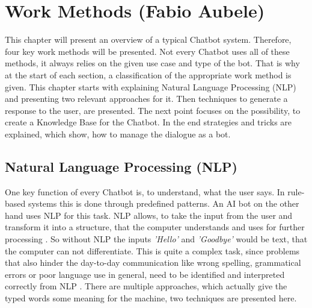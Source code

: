\documentclass[10pt,final,journal,a4paper,oneside,twocolumn]{IEEEtran}
\begin{document}
\section{Work Methods (Fabio Aubele)}\label{sec:archi}
This chapter will present an overview of a typical Chatbot system. Therefore, four key work methods will be presented. Not every Chatbot uses all of these methods, it always relies on the given use case and type of the bot. That is why at the start of each section, a classification of the appropriate work method is given. This chapter starts with explaining Natural Language Processing (NLP) and presenting two relevant approaches for it. Then techniques to generate a response to the user, are presented. The next point focuses on the possibility, to create a Knowledge Base for the Chatbot. In the end strategies and tricks are explained, which show, how to manage the dialogue as a bot.

\subsection{Natural Language Processing (NLP)}
One key function of every Chatbot is, to understand, what the user says. In rule-based systems this is done through predefined patterns. An AI bot on the other hand uses NLP for this task. NLP allows, to take the input from the user and transform it into a structure, that the computer understands and uses for further processing \cite{b10}. So without NLP the inputs \textit{'Hello'} and \textit{'Goodbye'} would be text, that the computer can not differentiate. This is quite a complex task, since problems that also hinder the day-to-day communication like wrong spelling, grammatical errors or poor language use in general, need to be identified and interpreted correctly from NLP \cite{b10}. There are multiple approaches, which actually give the typed words some meaning for the machine, two techniques are presented here.
\\
\end{document}
